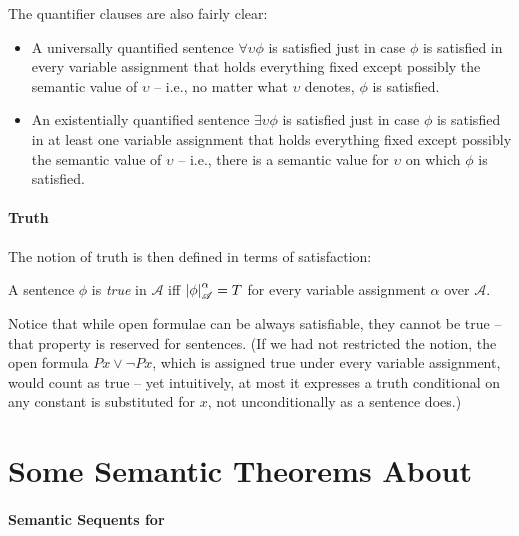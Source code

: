 The quantifier clauses are also fairly clear: \begin{itemize}
	\item A universally quantified sentence $\forall \upsilon \phi$ is satisfied just in case $\phi$ is satisfied in every variable assignment that holds everything fixed except possibly the semantic value of $\upsilon$ – i.e., no matter what $\upsilon$ denotes, $\phi$ is satisfied.
	\item An existentially quantified sentence $\exists \upsilon \phi$ is satisfied just in case $\phi$ is satisfied in at least one variable assignment that holds everything fixed except possibly the semantic value of $\upsilon$ – i.e., there is a semantic value for $\upsilon$ on which $\phi$ is satisfied.	
\end{itemize}

\paragraph{Truth}

The notion of truth is then defined in terms of satisfaction:
\begin{definition}[Truth]
	A sentence $\phi$ is \emph{true} in $\mathscr{A}$ iff $\left|\phi\right|^{\alpha}_{\mathscr{A}}=T$ for every variable assignment $\alpha$ over $\mathscr{A}$. 
\end{definition}


Notice that while open formulae can be always satisfiable, they cannot be true – that property is reserved for sentences. (If we had not restricted the notion, the open formula $Px\vee\neg Px$, which is assigned true under every variable assignment, would count as true – yet intuitively, at most it expresses a truth conditional on any constant is substituted for $x$, not unconditionally as a sentence does.)


\section{Some Semantic Theorems About \ltwo}
\paragraph{Semantic Sequents for \ltwo}

